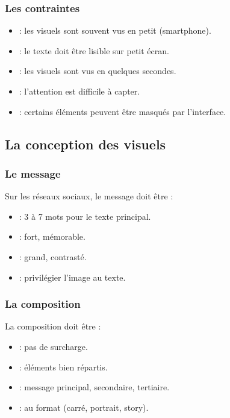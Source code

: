 \subsubsection{Les contraintes}

\begin{itemize}
    \item {} : les visuels sont souvent vus en petit (smartphone).
    \item {} : le texte doit être lisible sur petit écran.
    \item {} : les visuels sont vus en quelques secondes.
    \item {} : l'attention est difficile à capter.
    \item {} : certains éléments peuvent être masqués par l'interface.
\end{itemize}

\subsection{La conception des visuels}

\subsubsection{Le message}

Sur les réseaux sociaux, le message doit être :

\begin{itemize}
    \item {} : 3 à 7 mots pour le texte principal.
    \item {} : fort, mémorable.
    \item {} : grand, contrasté.
    \item {} : privilégier l'image au texte.
\end{itemize}

\subsubsection{La composition}

La composition doit être :

\begin{itemize}
    \item {} : pas de surcharge.
    \item {} : éléments bien répartis.
    \item {} : message principal, secondaire, tertiaire.
    \item {} : au format (carré, portrait, story).
\end{itemize}

